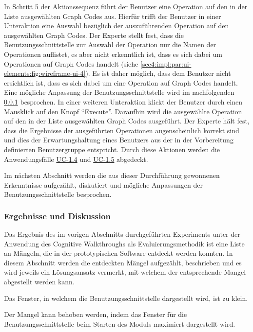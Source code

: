 In Schritt 5 der Aktionssequenz führt der Benutzer eine Operation auf den in der Liste ausgewählten Graph Codes aus.
Hierfür trifft der Benutzer in einer Unteraktion eine Auswahl bezüglich der auszuführenden Operation auf den ausgewählten Graph Codes.
Der Experte stellt fest, dass die Benutzungsschnittstelle zur Auswahl der Operation nur die Namen der Operationen auflistet, es aber nicht erkenntlich ist, dass es sich dabei um Operationen auf Graph Codes handelt (siehe \cref{sec4:impl:par:ui-elements:fig:wireframe-ui-4}).
Es ist daher möglich, dass dem Benutzer nicht ersichtlich ist, dass es sich dabei um eine Operation auf Graph Codes handelt.
Eine mögliche Anpassung der Benutzungsschnittstelle wird im nachfolgenden \cref{sec5:eval:subsubsec:exp-1:results-discussion} besprochen.
In einer weiteren Unteraktion klickt der Benutzer durch einen Mausklick auf den Knopf \enquote{Execute}.
Daraufhin wird die ausgewählte Operation auf den in der Liste ausgewählten Graph Codes ausgeführt.
Der Experte hält fest, dass die Ergebnisse der ausgeführten Operationen augenscheinlich korrekt sind und dies der Erwartungshaltung eines Benutzers aus der in der Vorbereitung definierten Benutzergruppe entspricht.
Durch diese Aktionen werden die Anwendungsfälle \hyperref[sec3:model:uc-1.4]{UC-1.4} und \hyperref[sec3:model:uc-1.5]{UC-1.5} abgedeckt.

Im nächsten Abschnitt werden die aus dieser Durchführung gewonnenen Erkenntnisse aufgezählt, diskutiert und mögliche Anpassungen der Benutzungsschnittstelle besprochen.

\subsubsection{Ergebnisse und Diskussion}
\label{sec5:eval:subsubsec:exp-1:results-discussion}
Das Ergebnis des im vorigen Abschnitts durchgeführten Experiments unter der Anwendung des Cognitive Walkthroughs als Evaluierungsmethodik ist eine Liste an Mängeln, die in der prototypischen Software entdeckt werden konnten.
In diesem Abschnitt werden die entdeckten Mängel aufgezählt, beschrieben und es wird jeweils ein Lösungsansatz vermerkt, mit welchem der entsprechende Mangel abgestellt werden kann.

Das Fenster, in welchem die Benutzungsschnittstelle dargestellt wird, ist zu klein.

Der Mangel kann behoben werden, indem das Fenster für die Benutzungsschnittstelle beim Starten des Moduls maximiert dargestellt wird.

